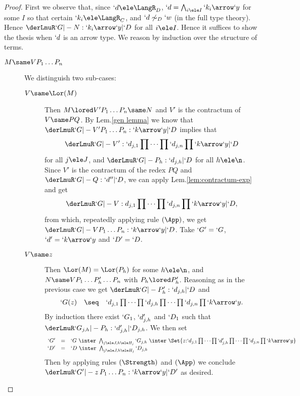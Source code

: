 \documentclass{CSML}
\begin{document}
 \begin{proof}
First we observe that, since $`d \ele \LangR_D$, $`d = \bigwedge_{i\ele I} `k_i\arrow`y$ for some $I$ so that certain $`k_i \ele \LangR_C$, and $`d \not\sim_D`w$ (in the full type theory).
Hence $\derLmuR `G |- N : `k_i\arrow`y | `D $ for all $i\ele I$. 
Hence it suffices to show the thesis when $`d$ is an arrow type.
We reason by induction over the structure of terms.

 \begin{description}

\item [$ M \same VP_1\dots P_n $] 
	We distinguish two sub-cases:	

 	\begin {description}

 	\item [$V \same \Lor(M)$] Then $M \lored V'P_1\dots P_n \same N$ and $V'$ is the contractum of $V \same PQ$.
By Lem.\skp\ref{gen lemma} we know that $\derLmuR `G |- V'P_1\dots P_n : `k\arrow`y | `D $ implies that 
 \[ \derLmuR `G |- V' : `d_{j,1}\prod \cdots\prod `d_{j,n}\prod `k\arrow`y | `D \] 
for all $j\ele J$, and $\derLmuR `G |- P_h: `d_{j,h} | `D $ for all $h \ele \n$. 
Since $V'$ is the contractum of the redex $PQ$ and $\derLmuR `G |- Q : `d'' | `D $, we can apply Lem.\skp\ref{lem:contractum-exp} and get 
 \[ \derLmuR `G |- V : d_{j,1}\prod \cdots\prod `d_{j,n}\prod `k\arrow`y | `D , \]
from which, repeatedly applying rule $(\App)$, we get $\derLmuR `G |- VP_1\dots P_n : `k\arrow`y | `D $. Take $`G' = `G$, $`d'= `k\arrow`y$ and $`D' = `D $.
 
 \item [$V \same z$] Then $\Lor(M) = \Lor(P_h) $ for some $h \ele \n$, and $N \same VP_1\dots P'_h \dots P_n$ with $P_h \lored P'_h$. 
Reasoning as in the previous case we get $\derLmuR `G |- P'_h: `d_{j,h} | `D $ and 
 \[ \begin{array}{rcl}
`G(z) &\seq& `d_{j,1}\prod \dots\prod `d_{j,h}\prod \dots\prod `d_{j,n}\prod `k\arrow`y.
 \end{array} \] 
By induction there exist $`G_1$, $`d'_{j,h}$ and $`D_1$ such that $\derLmuR `G_{j,h} |- P_h: `d'_{j,h} | `D_{j,h} $. 
We then set 
 \[ \begin{array}{rcl}
`G' &=&`G \ \inter \ \bigwedge_{j\ele J, h\ele H_j}`G_{j,h} \ \inter \ 
	\Set{ z{:}`d_{j,1}\prod \dots\prod `d'_{j,h}\prod \dots\prod `d_{j,n}\prod `k\arrow `y} \\
`D' &=& `D \ \inter \ \bigwedge_{j\ele J, h\ele H_j}`D_{j,h} 
 \end{array} \]
Then by applying rules $(\Strength)$ and $(\App)$ we conclude $\derLmuR `G' |- z\,P_1\dots P_n : `k\arrow`y | `D' $ as desired.	 
 \end{description}
	

\end{description}
\end{proof}
\end{document}
